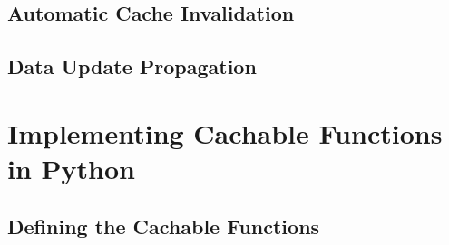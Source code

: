 \subsection{Automatic Cache Invalidation}
\label{subsec:automatic_cache_invalidation}


\subsection{Data Update Propagation}
\label{subsec:model_data_update_propagation}


\section{Implementing Cachable Functions in Python}
\label{sec:implementing_cachable_functions_in_python}

\subsection{Defining the Cachable Functions}
\label{subsec:defining_the_cachable_functions}





